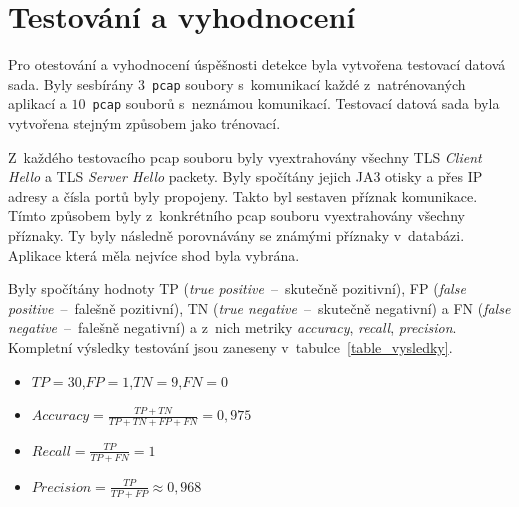 
\section{Testování a vyhodnocení}
\label{sec_testing}

Pro otestování a vyhodnocení úspěšnosti detekce byla vytvořena testovací datová sada. Byly sesbírány $3$~\texttt{pcap} soubory s~komunikací každé z~natrénovaných aplikací a $10$~\texttt{pcap} souborů s~neznámou komunikací. Testovací datová sada byla vytvořena stejným způsobem jako trénovací.

Z~každého testovacího pcap souboru byly vyextrahovány všechny TLS \textit{Client Hello} a TLS \textit{Server Hello} packety. Byly spočítány jejich JA3 otisky a přes IP adresy a čísla portů byly propojeny. Takto byl sestaven příznak komunikace. Tímto způsobem byly z~konkrétního pcap souboru vyextrahovány všechny příznaky. Ty byly následně porovnávány se známými příznaky v~databázi. Aplikace která měla nejvíce shod byla vybrána.

Byly spočítány hodnoty TP (\textit{true positive}~--~skutečně pozitivní), FP (\textit{false positive}~--~falešně pozitivní), TN (\textit{true negative}~--~skutečně negativní) a FN (\textit{false negative}~--~falešně negativní) a z~nich metriky \textit{accuracy}, \textit{recall}, \textit{precision}. Kompletní výsledky testování jsou zaneseny v~tabulce~\ref{table_vysledky}.

\begin{itemize}
    \item $TP = 30$,\;\;$FP = 1$,\;\;$TN = 9$,\;\;$FN = 0$
    \item $Accuracy = \frac{TP + TN}{TP + TN + FP + FN} = 0,975$
    \item $Recall = \frac{TP}{TP + FN} = 1$
    \item $Precision = \frac{TP}{TP + FP} \approx 0,968$
\end{itemize}

